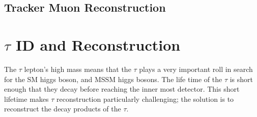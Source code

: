 \subsection{Tracker Muon Reconstruction}




\section{$\tau$ ID and Reconstruction}
The $\tau$ lepton's high mass means that the $\tau$ plays a very important
roll in search for the SM higgs boson, and MSSM higgs bosons.
The life time of the $\tau$ is short enough that they decay before reaching the inner
most detector. This short lifetime makes $\tau$ reconstruction particularly challenging;
the solution is to reconstruct the decay products of the $\tau$. 

